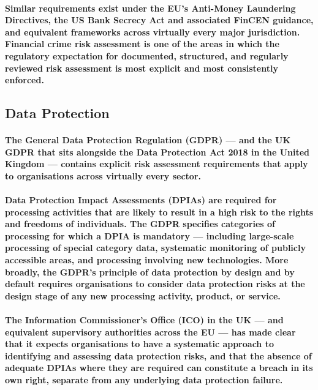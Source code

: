 \paragraph{Similar requirements exist under the \textbf{EU's Anti-Money Laundering Directives}, the \textbf{US Bank Secrecy Act and associated FinCEN guidance}, and equivalent frameworks across virtually every major jurisdiction. Financial crime risk assessment is one of the areas in which the regulatory expectation for documented, structured, and regularly reviewed risk assessment is most explicit and most consistently enforced.}

\subsection{Data Protection}
\paragraph{The \textbf{General Data Protection Regulation (GDPR)} — and the \textbf{UK GDPR} that sits alongside the \textbf{Data Protection Act 2018} in the United Kingdom — contains explicit risk assessment requirements that apply to organisations across virtually every sector.}
\paragraph{\textbf{Data Protection Impact Assessments (DPIAs)} are required for processing activities that are likely to result in a high risk to the rights and freedoms of individuals. The GDPR specifies categories of processing for which a DPIA is mandatory — including large-scale processing of special category data, systematic monitoring of publicly accessible areas, and processing involving new technologies. More broadly, the GDPR's principle of \textbf{data protection by design and by default} requires organisations to consider data protection risks at the design stage of any new processing activity, product, or service.}
\paragraph{The \textbf{Information Commissioner's Office (ICO)} in the UK — and equivalent supervisory authorities across the EU — has made clear that it expects organisations to have a systematic approach to identifying and assessing data protection risks, and that the absence of adequate DPIAs where they are required can constitute a breach in its own right, separate from any underlying data protection failure.}
